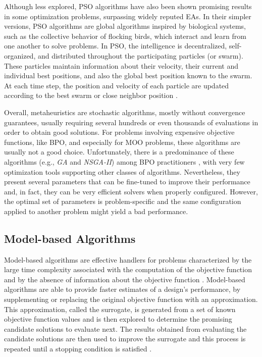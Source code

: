 Although less explored, \ac{PSO} algorithms have also been shown promising results in some optimization problems, surpassing widely reputed \acp{EA}. In their simpler versions, \ac{PSO} algorithms are global algorithms inspired by biological systems, such as the collective behavior of flocking birds, which interact and learn from one another to solve problems. In \ac{PSO}, the intelligence is decentralized, self-organized, and distributed throughout the participating particles (or swarm). These particles maintain information about their velocity, their current and individual best positions, and also the global best position known to the swarm. At each time step, the position and velocity of each particle are updated according to the best swarm or close neighbor position \cite{Glover2003Metaheuristics}.
	
Overall, metaheuristics are stochastic algorithms, mostly without convergence guarantees, usually requiring several hundreds or even thousands of evaluations in order to obtain good solutions. For problems involving expensive objective functions, like \ac{BPO}, and especially for \ac{MOO} problems, these algorithms are usually not a good choice. Unfortunately, there is a predominance of these algorithms (e.g., \textit{\ac{GA}} and \textit{\ac{NSGA-II}}) among \ac{BPO} practitioners \cite{Wortmann2017GABESTCHOICE}, with very few optimization tools supporting other classes of algorithms. Nevertheless, they present several parameters that can be fine-tuned to improve their performance and, in fact, they can be very efficient solvers when properly configured. However, the optimal set of parameters is problem-specific and the same configuration applied to another problem might yield a bad performance.

\subsection{Model-based Algorithms}
Model-based algorithms are effective handlers for problems characterized by the large time complexity associated with the computation of the objective function and by the absence of information about the objective function \cite{Forrester2009SBO}. Model-based algorithms are able to provide faster estimates of a design’s performance, by supplementing or replacing the original objective function with an approximation. This approximation, called the surrogate, is generated from a set of known objective function values and is then explored to determine the promising candidate solutions to evaluate next. The results obtained from evaluating the candidate solutions are then used to improve the surrogate and this process is repeated until a stopping condition is satisfied \cite{Koziel2011}.

